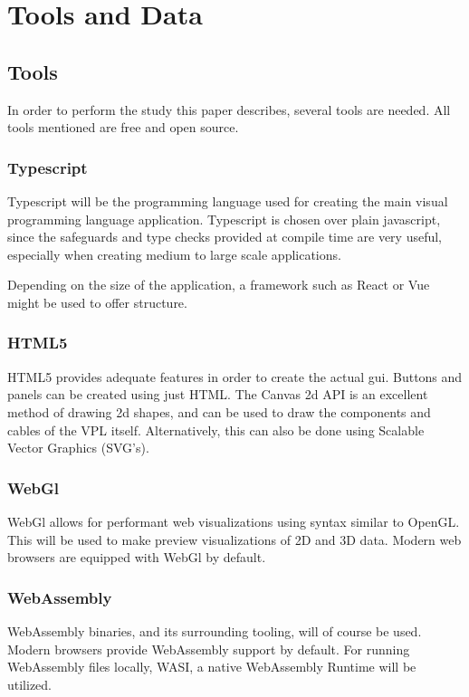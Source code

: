 \newpage
\section{Tools and Data}

\subsection{Tools}
In order to perform the study this paper describes, several tools are needed. All tools mentioned are free and open source.

\subsubsection*{Typescript}
Typescript will be the programming language used for creating the main visual programming language application. Typescript is chosen over plain javascript, since the safeguards and type checks provided at compile time are very useful, especially when creating medium to large scale applications. 

Depending on the size of the application, a framework such as React or Vue might be used to offer structure.

\subsubsection*{HTML5}
HTML5 provides adequate features in order to create the actual \ac{gui}. Buttons and panels can be created using just HTML. The Canvas 2d API is an excellent method of drawing 2d shapes, and can be used to draw the components and cables of the VPL itself. Alternatively, this can also be done using Scalable Vector Graphics (SVG's). 

\subsubsection*{WebGl}
WebGl allows for performant web visualizations using syntax similar to OpenGL. This will be used to make preview visualizations of 2D and 3D data. Modern web browsers are equipped with WebGl by default. 

\subsubsection*{WebAssembly}
WebAssembly binaries, and its surrounding tooling, will of course be used. Modern browsers provide WebAssembly support by default. For running WebAssembly files locally, WASI, a native WebAssembly Runtime will be utilized. 

